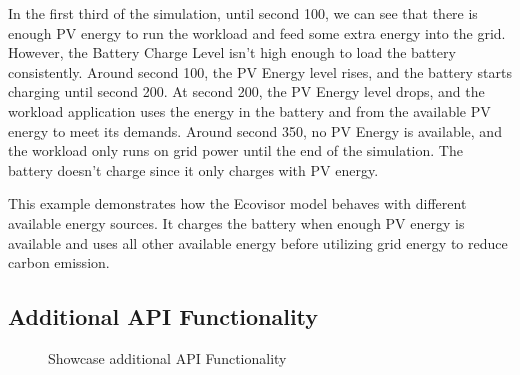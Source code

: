 In the first third of the simulation, until second 100, we can see that there is
enough PV energy to run the workload and feed some extra energy into the grid.
However, the Battery Charge Level isn't high enough to load the battery
consistently. Around second 100, the PV Energy level rises, and the battery
starts charging until second 200. At second 200, the PV Energy level drops, and
the workload application uses the energy in the battery and from the available
PV energy to meet its demands. Around second 350, no PV Energy is available, and
the workload only runs on grid power until the end of the simulation. The
battery doesn't charge since it only charges with PV energy.

This example demonstrates how the Ecovisor model behaves with different
available energy sources. It charges the battery when enough PV energy is
available and uses all other available energy before utilizing grid energy to
reduce carbon emission.


\subsection{Additional API Functionality}

\begin{figure*}
    \centering
    \caption{Showcase additional API Functionality}
    \label{fig:example_case_b}
\end{figure*}

